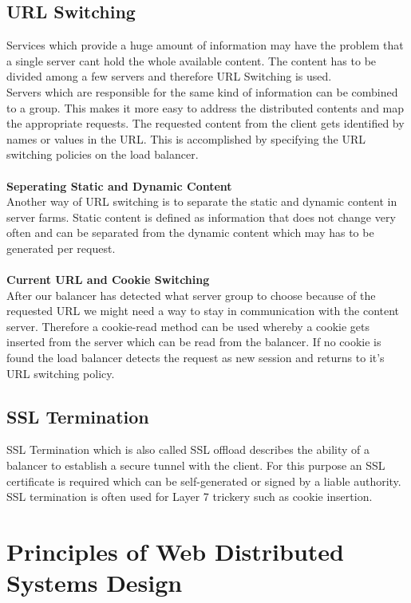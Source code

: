 \documentclass[12p]{article}
\begin{document}
	\subsection{URL Switching}
	Services which provide a huge amount of information may have the problem that a single server cant hold the whole available content. The content has to be divided among a few servers and therefore URL Switching is used.\\
	Servers which are responsible for the same kind of information can be combined to a group. This makes it more easy to address the distributed contents and map the appropriate requests.
	The requested content from the client gets identified by names or values in the URL. This is accomplished by specifying the URL switching policies on the load balancer.\\
	\\
	\textbf{Seperating Static and Dynamic Content}\\
	Another way of URL switching is to separate the static and dynamic content in server farms. Static content is defined as information that does not change very often and can be separated from the dynamic content which may has to be generated per request.\\
	\\
	\textbf{Current URL and Cookie Switching}\\
	After our balancer has detected what server group to choose because of the requested URL we might need a way to stay in communication with the content server. Therefore a cookie-read method can be used whereby a cookie gets inserted from the server which can be read from the balancer.
	If no cookie is found the load balancer detects the request as new session and returns to it's URL switching policy. \cite{lb_SFC}
	
	\subsection{SSL Termination}
	SSL Termination which is also called SSL offload describes the ability of a balancer to establish a secure tunnel with the client. For this purpose an SSL certificate is required which can be self-generated or signed by a liable authority.\\ 
	SSL termination is often used for Layer 7 trickery such as cookie insertion. \cite{AppLayerBalancing}
	
	\newpage
	\section{Principles of Web Distributed Systems Design}
\end{document}

